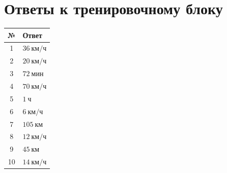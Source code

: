 \documentclass[a4paper,12pt]{article}
\newcommand{\kmh}{\text{км/ч}}
\newcommand{\km}{\text{км}}
\newcommand{\ch}{\text{ч}}
\newcommand{\minut}{\text{мин}}
\begin{document}
\newpage

\section{Ответы к тренировочному блоку}

\begin{center}
\renewcommand{\arraystretch}{1.35}
\begin{tabularx}{0.9\linewidth}{c X}
\toprule
\textbf{№} & \textbf{Ответ} \\
\midrule
1 & $36\ \kmh$ \\
2 & $20\ \kmh$ \\
3 & $72\ \minut$ \\
4 & $70\ \kmh$ \\
5 & $1\ \ch$ \\
6 & $6\ \kmh$ \\
7 & $105\ \km$ \\
8 & $12\ \kmh$ \\
9 & $45\ \km$ \\
10 & $14\ \kmh$ \\
\bottomrule
\end{tabularx}
\end{center}
\end{document}

